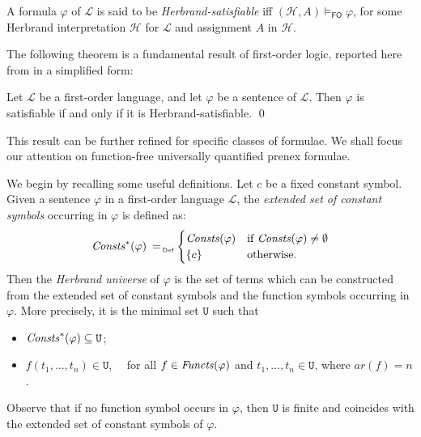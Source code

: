 \documentclass[a4paper]{llncs}
\newcommand{\Lang}{\ensuremath{\mathcal{L}\xspace}} %
\newcommand{\Univ}{\mathtt{U}}
\newcommand{\ar}{\mathit{ar}}
\newcommand{\hinter}{\ensuremath{\mathcal{H}}}
\newcommand{\fomodels}[2]{#1 \models_{\mathsf{FO}} #2}
\begin{document}
A formula $\varphi$ of $\Lang$ is said to be
\emph{Herbrand-satisfiable} iff
$\fomodels{(\hinter,A)}{\varphi}$, for some Herbrand interpretation 
$\hinter$ for $\Lang$ and assignment $A$ in $\hinter$.

The following theorem is a fundamental result of first-order
logic, reported here from \cite[Theorem 5.9.4]{Fitting96}
in a simplified form:

\begin{theorem}\label{HERSENT}
Let $\Lang$ be a first-order
language, and let $\varphi$ be a sentence of $\Lang$. Then
$\varphi$ is satisfiable if and only if it is Herbrand-satisfiable.
\qed
\end{theorem}
%
This result can be further refined for specific classes of formulae.
We shall focus our attention on function-free
universally quantified prenex formulae.

We begin by recalling some useful
definitions. Let $c$ be a fixed constant symbol. Given a sentence 
$\varphi$ in a first-order language $\Lang$, the \emph{extended set 
of constant symbols} occurring in $\varphi$ is defined as:
\[
\Consts^*(\varphi) \defAs
\begin{cases}
\Consts(\varphi) & \text{if } \Consts(\varphi) \neq \emptyset\\
\{c\} & \text{otherwise.}
\end{cases}
\]
Then the \emph{Herbrand universe} of $\varphi$ is the set of terms which can
be constructed from the extended set of constant symbols and the 
function symbols occurring in $\varphi$.
More precisely, it is the minimal set $\Univ$ such that
\begin{itemize}
\item $\Consts^*(\varphi) \subseteq \Univ$;
%

\item $f(t_1, \ldots, t_n) \in \Univ$, ~~for all $f \in 
\mathit{Functs}(\varphi)$ and $t_1, \ldots, t_n \in \Univ$, where $\ar(f)=n$.
\end{itemize}
%
Observe that if no function symbol occurs in $\varphi$, then $\Univ$ 
is finite and coincides with the extended set of constant symbols of 
$\varphi$.
\end{document}
